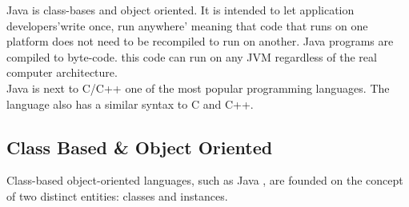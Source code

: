 Java is class-bases and object oriented. It is intended to let application developers'write once, run anywhere' meaning that code that runs on one platform does not need to be recompiled to run on another. Java programs are compiled to byte-code. this code can run on any JVM regardless of the real computer architecture.\cite{javaWiki}
\\

Java is next to C/C++ one of the most popular programming languages.\cite{progLangPop} The language also has a similar syntax to C and C++.

\subsection{Class Based \& Object Oriented}
Class-based object-oriented languages, such as Java , are founded on the concept of two distinct entities: classes and instances.\cite{
ObjectClass} 

